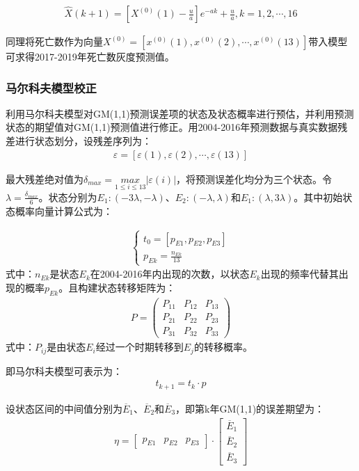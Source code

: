 \documentclass{whutmod}
\begin{document}
	     \begin{gather}
	     \widehat{X}(k+1)=[X^{(0)}(1)-\frac{u}{a}]e^{-ak}+\frac{u}{a},k=1,2,\cdots,16
	     \end{gather}
	     
	     同理将死亡数作为向量$X^{(0)}=[x^{(0)}(1),x^{(0)}(2),\cdots,x^{(0)}(13)]$带入模型可求得2017-2019年死亡数灰度预测值。
	     \subsubsection{马尔科夫模型校正}
	     利用马尔科夫模型对GM(1,1)预测误差项的状态及状态概率进行预估，并利用预测状态的期望值对GM(1,1)预测值进行修正\cite{bib:2}。用2004-2016年预测数据与真实数据残差进行状态划分，设残差序列为：
	     \begin{gather*}
	    \varepsilon =[\varepsilon(1) ,\varepsilon(2), \cdots,\varepsilon(13)]
	     \end{gather*}
	     
	    最大残差绝对值为$\delta _{max}=\underset{1\leqslant i\leqslant13 }{max}\left | \varepsilon(i) \right |$，将预测误差化均分为三个状态。令$\lambda =\frac{\delta _{max}}{6}$。状态分别为$E_{1}:(-3\lambda,-\lambda)$、$E_{2}:(-\lambda,\lambda)$和$E_{1}:(\lambda,3\lambda)$。其中初始状态概率向量计算公式为：
	    
	   \begin{gather}
	 \left\{\begin{matrix}
	 t_{0}=[p_{E1},p_{E2},p_{E3}]\\ 
	 p_{Ek}=\frac{n_{Ek}}{13}
	 \end{matrix}\right.
	  \end{gather}
	  式中：$n_{Ek}$是状态$E_{k}$在2004-2016年内出现的次数，以状态$E_{k}$出现的频率代替其出现的概率$p_{Ek}$。且构建状态转移矩阵为：
	   \begin{gather*}
	  P=\left(\begin{array}{lll}{P_{11}} & {P_{12}} & {P_{13}} \\ {P_{21}} & {P_{22}} & {P_{23}} \\ {P_{31}} & {P_{32}} & {P_{33}}\end{array}\right)
	  \end{gather*}
	   式中：$P_{ij}$是由状态$E_{i}$经过一个时期转移到$E_{j}$的转移概率。
	   
	   即马尔科夫模型可表示为：	  
	   \begin{gather}
	   t_{k+1}=t_{k} \cdot p
	  \end{gather}
	  
	  设状态区间的中间值分别为$\overline{E}_{1}$、$\overline{E}_{2}$和$\overline{E}_{3}$，即第k年GM(1,1)的误差期望为：
	   \begin{gather}
\eta =\begin{bmatrix}
p_{E1} & p_{E2} & p_{E3}
\end{bmatrix} \cdot\begin{bmatrix}
\overline{E}_{1}\\ 
\overline{E}_{2}\\ 
\overline{E}_{3}
\end{bmatrix}
	  \end{gather}
	  
\end{document}
